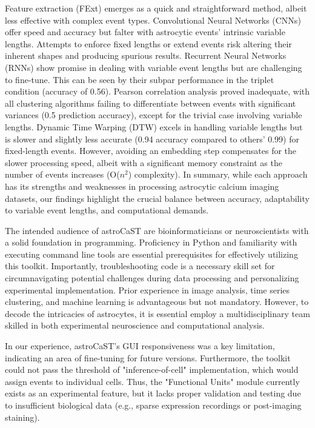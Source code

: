 Feature extraction (FExt) emerges as a quick and straightforward method, albeit less effective with complex event types. Convolutional Neural Networks (CNNs) offer speed and accuracy but falter with astrocytic events' intrinsic variable lengths. Attempts to enforce fixed lengths or extend events risk altering their inherent shapes and producing spurious results. Recurrent Neural Networks (RNNs) show promise in dealing with variable event lengths but are challenging to fine-tune. This can be seen by their subpar performance in the triplet condition (accuracy of 0.56). Pearson correlation analysis proved inadequate, with all clustering algorithms failing to differentiate between events with significant variances (0.5 prediction accuracy), except for the trivial case involving variable lengths. Dynamic Time Warping (DTW) excels in handling variable lengths but is slower and slightly less accurate (0.94 accuracy compared to others' 0.99) for fixed-length events. However, avoiding an embedding step compensates for the slower processing speed, albeit with a significant memory constraint as the number of events increases (O($n^2$) complexity). In summary, while each approach has its strengths and weaknesses in processing astrocytic calcium imaging datasets, our findings highlight the crucial balance between accuracy, adaptability to variable event lengths, and computational demands.

The intended audience of astroCaST are bioinformaticians or neuroscientists with a solid foundation in programming. Proficiency in Python and familiarity with executing command line tools are essential prerequisites for effectively utilizing this toolkit. Importantly, troubleshooting code is a necessary skill set for circumnavigating potential challenges during data processing and personalizing experimental implementation. Prior experience in image analysis, time series clustering, and machine learning is advantageous but not mandatory. However, to decode the intricacies of astrocytes, it is essential employ a multidisciplinary team skilled in both experimental neuroscience and computational analysis.

In our experience, astroCaST's \ac{GUI} responsiveness was a key limitation, indicating an area of fine-tuning for future versions. Furthermore, the toolkit could not pass the threshold of "inference-of-cell" implementation, which would assign events to individual cells. Thus, the "Functional Units" module currently exists as an experimental feature, but it lacks proper validation and testing due to insufficient biological data (e.g., sparse  expression recordings or post-imaging staining).

